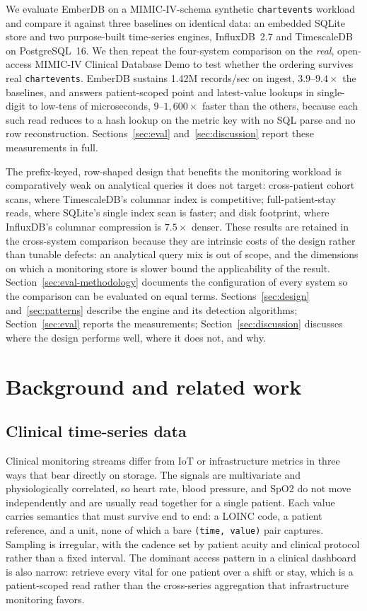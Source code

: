 \documentclass[journal]{IEEEtran}
\begin{document}
We evaluate EmberDB on a MIMIC-IV-schema synthetic \texttt{chartevents} workload and compare it against three baselines on identical data: an embedded SQLite store and two purpose-built time-series engines, InfluxDB~2.7 and TimescaleDB on PostgreSQL~16. We then repeat the four-system comparison on the \emph{real}, open-access MIMIC-IV Clinical Database Demo to test whether the ordering survives real \texttt{chartevents}. EmberDB sustains 1.42M records/sec on ingest, $3.9$--$9.4\times$ the baselines, and answers patient-scoped point and latest-value lookups in single-digit to low-tens of microseconds, $9$--$1{,}600\times$ faster than the others, because each such read reduces to a hash lookup on the metric key with no SQL parse and no row reconstruction. Sections~\ref{sec:eval} and~\ref{sec:discussion} report these measurements in full.

The prefix-keyed, row-shaped design that benefits the monitoring workload is comparatively weak on analytical queries it does not target: cross-patient cohort scans, where TimescaleDB's columnar index is competitive; full-patient-stay reads, where SQLite's single index scan is faster; and disk footprint, where InfluxDB's columnar compression is $7.5\times$ denser. These results are retained in the cross-system comparison because they are intrinsic costs of the design rather than tunable defects: an analytical query mix is out of scope, and the dimensions on which a monitoring store is slower bound the applicability of the result. Section~\ref{sec:eval-methodology} documents the configuration of every system so the comparison can be evaluated on equal terms. Sections~\ref{sec:design} and~\ref{sec:patterns} describe the engine and its detection algorithms; Section~\ref{sec:eval} reports the measurements; Section~\ref{sec:discussion} discusses where the design performs well, where it does not, and why.

\section{Background and related work}
\label{sec:related}

\subsection{Clinical time-series data}
Clinical monitoring streams differ from IoT or infrastructure metrics in three ways that bear directly on storage. The signals are multivariate and physiologically correlated, so heart rate, blood pressure, and SpO2 do not move independently and are usually read together for a single patient. Each value carries semantics that must survive end to end: a LOINC code, a patient reference, and a unit, none of which a bare \texttt{(time, value)} pair captures. Sampling is irregular, with the cadence set by patient acuity and clinical protocol rather than a fixed interval. The dominant access pattern in a clinical dashboard is also narrow: retrieve every vital for one patient over a shift or stay, which is a patient-scoped read rather than the cross-series aggregation that infrastructure monitoring favors.
\end{document}

